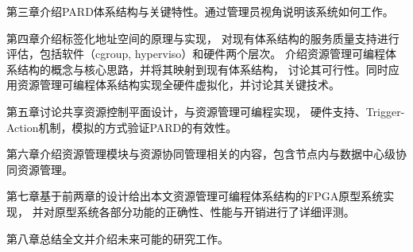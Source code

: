 第三章介绍PARD体系结构与关键特性。通过管理员视角说明该系统如何工作。

第四章介绍标签化地址空间的原理与实现，
对现有体系结构的服务质量支持进行评估，包括软件（cgroup, hyperviso）和硬件两个层次。
介绍资源管理可编程体系结构的概念与核心思路，并将其映射到现有体系结构，
讨论其可行性。同时应用资源管理可编程体系结构实现全硬件虚拟化，并讨论其关键技术。

第五章讨论共享资源控制平面设计，与资源管理可编程实现，
硬件支持、Trigger-Action机制，模拟的方式验证PARD的有效性。

第六章介绍资源管理模块与资源协同管理相关的内容，包含节点内与数据中心级协同资源管理。

第七章基于前两章的设计给出本文资源管理可编程体系结构的FPGA原型系统实现，
并对原型系统各部分功能的正确性、性能与开销进行了详细评测。

第八章总结全文并介绍未来可能的研究工作。
